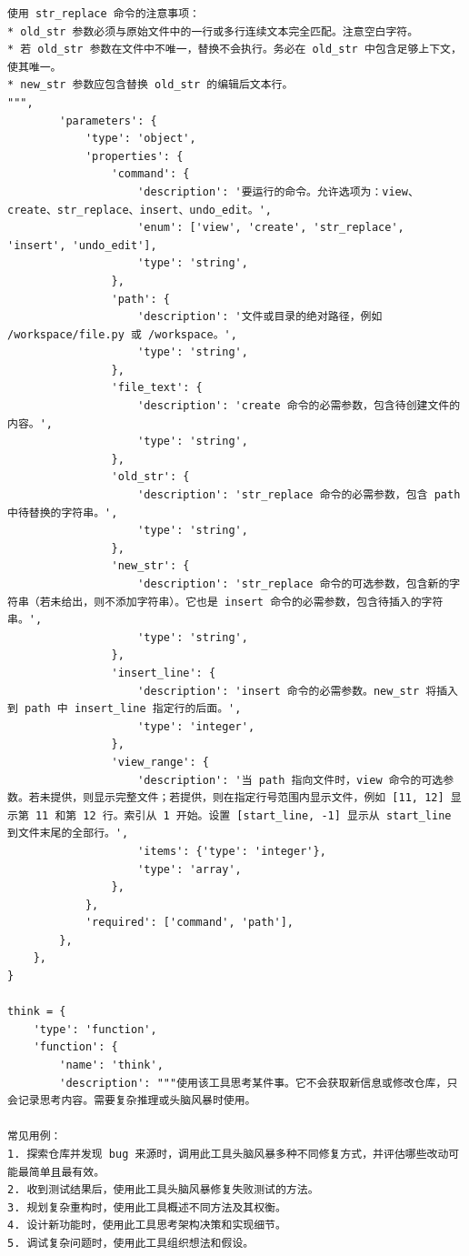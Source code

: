 {\begin{Verbatim}[breaklines, breakanywhere]
使用 str_replace 命令的注意事项：
* old_str 参数必须与原始文件中的一行或多行连续文本完全匹配。注意空白字符。
* 若 old_str 参数在文件中不唯一，替换不会执行。务必在 old_str 中包含足够上下文，使其唯一。
* new_str 参数应包含替换 old_str 的编辑后文本行。
""",
        'parameters': {
            'type': 'object',
            'properties': {
                'command': {
                    'description': '要运行的命令。允许选项为：view、create、str_replace、insert、undo_edit。',
                    'enum': ['view', 'create', 'str_replace', 'insert', 'undo_edit'],
                    'type': 'string',
                },
                'path': {
                    'description': '文件或目录的绝对路径，例如 /workspace/file.py 或 /workspace。',
                    'type': 'string',
                },
                'file_text': {
                    'description': 'create 命令的必需参数，包含待创建文件的内容。',
                    'type': 'string',
                },
                'old_str': {
                    'description': 'str_replace 命令的必需参数，包含 path 中待替换的字符串。',
                    'type': 'string',
                },
                'new_str': {
                    'description': 'str_replace 命令的可选参数，包含新的字符串（若未给出，则不添加字符串）。它也是 insert 命令的必需参数，包含待插入的字符串。',
                    'type': 'string',
                },
                'insert_line': {
                    'description': 'insert 命令的必需参数。new_str 将插入到 path 中 insert_line 指定行的后面。',
                    'type': 'integer',
                },
                'view_range': {
                    'description': '当 path 指向文件时，view 命令的可选参数。若未提供，则显示完整文件；若提供，则在指定行号范围内显示文件，例如 [11, 12] 显示第 11 和第 12 行。索引从 1 开始。设置 [start_line, -1] 显示从 start_line 到文件末尾的全部行。',
                    'items': {'type': 'integer'},
                    'type': 'array',
                },
            },
            'required': ['command', 'path'],
        },
    },
}

think = {
    'type': 'function',
    'function': {
        'name': 'think',
        'description': """使用该工具思考某件事。它不会获取新信息或修改仓库，只会记录思考内容。需要复杂推理或头脑风暴时使用。

常见用例：
1. 探索仓库并发现 bug 来源时，调用此工具头脑风暴多种不同修复方式，并评估哪些改动可能最简单且最有效。
2. 收到测试结果后，使用此工具头脑风暴修复失败测试的方法。
3. 规划复杂重构时，使用此工具概述不同方法及其权衡。
4. 设计新功能时，使用此工具思考架构决策和实现细节。
5. 调试复杂问题时，使用此工具组织想法和假设。


\end{Verbatim}}
